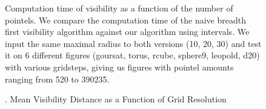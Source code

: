 

\begin{figure}[t]
  
  \caption{ \label{fig:meanvisibility-computationComplexity}Computation
    time of visibility as a function of the number of pointels. We
    compare the computation time of the naive breadth first visibility
    algorithm against our algorithm using intervals. We input the same
    maximal radius to both versions (10, 20, 30) and test it on 6
    different figures (goursat, torus, rcube, sphere9, leopold, d20)
    with various gridsteps, giving us figures with pointel amounts
    ranging from 520 to 390235.}
\end{figure}

\begin{figure}
  
  \caption{  \label{fig:meanvisibility-gridstep}. Mean Visibility Distance as a Function of Grid Resolution}
\end{figure}
